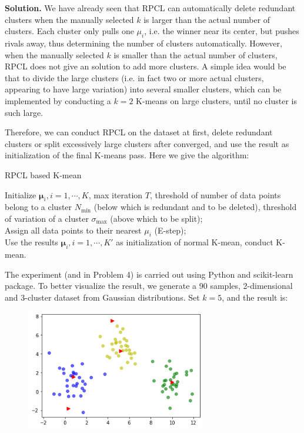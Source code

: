 \documentclass[12pt,a4paper,UTF8,fntef]{article}
\begin{document}
\textbf{Solution.} We have already seen that RPCL can automatically delete redundant clusters when the manually selected $k$ is larger than the actual number of clusters. Each cluster only pulls one $\mu_i$, i.e. the winner near its center, but pushes rivals away, thus determining the number of clusters automatically. However, when the manually selected $k$ is smaller than the actual number of clusters, RPCL does not give an solution to add more clusters. A simple idea would be that to divide the large clusters (i.e. in fact two or more actual clusters, appearing to have large variation) into several smaller clusters, which can be implemented by conducting a $k=2$ K-means on large clusters, until no cluster is such large.

Therefore, we can conduct RPCL on the dataset at first, delete redundant clusters or split excessively large clusters after converged, and use the result as initialization of the final K-means pass. Here we give the algorithm:
\newline
\begin{algorithm}[H]
	\caption{RPCL based K-mean}
	\BlankLine
	Initialize $\mathbf{\mu}_i, i=1,\cdots,K$, max iteration $T$, threshold of number of data points belong to a cluster $N_{\min}$ (below which is redundant and to be deleted), threshold of variation of a cluster $\sigma_{\max}$ (above which to be split);\\
	Assign all data points to their nearest $\mu_i$ (E-step);\\
Use the results $\mathbf{\mu}_i, i=1,\cdots,K'$ as initialization of normal K-mean, conduct K-mean.
\end{algorithm}

The experiment (and in Problem 4) is carried out using Python and scikit-learn package. To better visualize the result, we generate a 90 samples, 2-dimensional and 3-cluster dataset from Gaussian distributions. Set $k=5$, and the result is:
\begin{figure}[!h]
	\centering
	\includegraphics[width=0.7\textwidth]{untitled.png}
\end{figure}
\end{document}
